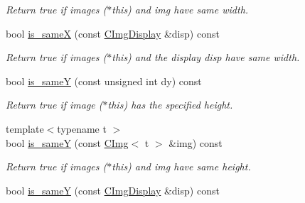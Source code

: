 \begin{DoxyCompactItemize}
\begin{DoxyCompactList}\small\item\em Return {\ttfamily true} if images {\ttfamily }($\ast$this) and {\ttfamily img} have same width. \item\end{DoxyCompactList}\item 
\hypertarget{structcimg__library_1_1CImg_a6f2389ea0ff1313b23523d557980a8a6}{
bool \hyperlink{structcimg__library_1_1CImg_a6f2389ea0ff1313b23523d557980a8a6}{is\_\-sameX} (const \hyperlink{structcimg__library_1_1CImgDisplay}{CImgDisplay} \&disp) const }
\label{structcimg__library_1_1CImg_a6f2389ea0ff1313b23523d557980a8a6}

\begin{DoxyCompactList}\small\item\em Return {\ttfamily true} if images {\ttfamily }($\ast$this) and the display {\ttfamily disp} have same width. \item\end{DoxyCompactList}\item 
\hypertarget{structcimg__library_1_1CImg_acb6a0d74efed60628344ce37e44aca31}{
bool \hyperlink{structcimg__library_1_1CImg_acb6a0d74efed60628344ce37e44aca31}{is\_\-sameY} (const unsigned int dy) const }
\label{structcimg__library_1_1CImg_acb6a0d74efed60628344ce37e44aca31}

\begin{DoxyCompactList}\small\item\em Return {\ttfamily true} if image ($\ast$this) has the specified height. \item\end{DoxyCompactList}\item 
\hypertarget{structcimg__library_1_1CImg_a8cade7d256506acc4797ac9b3d62f8d7}{
{\footnotesize template$<$typename t $>$ }\\bool \hyperlink{structcimg__library_1_1CImg_a8cade7d256506acc4797ac9b3d62f8d7}{is\_\-sameY} (const \hyperlink{structcimg__library_1_1CImg}{CImg}$<$ t $>$ \&img) const }
\label{structcimg__library_1_1CImg_a8cade7d256506acc4797ac9b3d62f8d7}

\begin{DoxyCompactList}\small\item\em Return {\ttfamily true} if images {\ttfamily }($\ast$this) and {\ttfamily img} have same height. \item\end{DoxyCompactList}\item 
\hypertarget{structcimg__library_1_1CImg_aa09668cd5a201595cccd19c4843066e7}{
bool \hyperlink{structcimg__library_1_1CImg_aa09668cd5a201595cccd19c4843066e7}{is\_\-sameY} (const \hyperlink{structcimg__library_1_1CImgDisplay}{CImgDisplay} \&disp) const }
\label{structcimg__library_1_1CImg_aa09668cd5a201595cccd19c4843066e7}


\end{DoxyCompactItemize}
